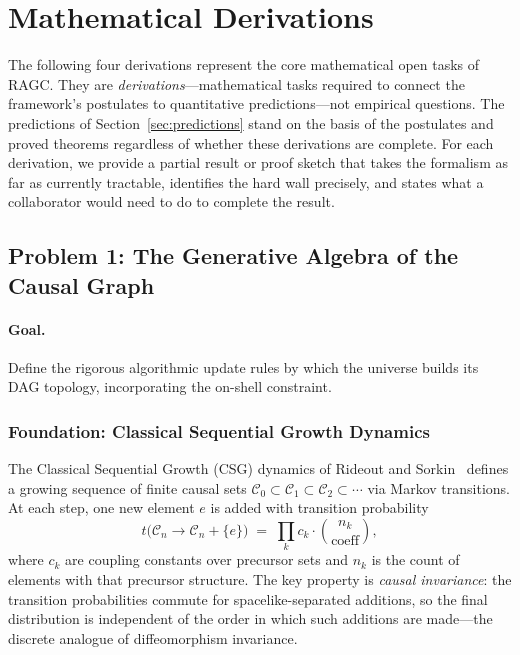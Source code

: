 \documentclass[11pt,a4paper]{article}
\theoremstyle{plain}
\theoremstyle{definition}
\theoremstyle{remark}
\begin{document}
\section{Mathematical Derivations}
\label{sec:math}

The following four derivations represent the core mathematical open tasks of
RAGC. They are \emph{derivations}---mathematical tasks required to connect the
framework's postulates to quantitative predictions---not empirical questions.
The predictions of Section~\ref{sec:predictions} stand on the basis of the
postulates and proved theorems regardless of whether these derivations are complete.
For each derivation, we provide a partial result or proof sketch that takes the
formalism as far as currently tractable, identifies the hard wall precisely, and
states what a collaborator would need to do to complete the result.

\subsection{Problem 1: The Generative Algebra of the Causal Graph}
\label{sec:algebra}

\paragraph{Goal.} Define the rigorous algorithmic update rules by which the
universe builds its DAG topology, incorporating the on-shell constraint.

\subsubsection{Foundation: Classical Sequential Growth Dynamics}

The Classical Sequential Growth (CSG) dynamics of Rideout and
Sorkin~\citep{RideoutSorkin2000} defines a growing sequence of finite causal sets
$\mathcal{C}_{0} \subset \mathcal{C}_{1} \subset \mathcal{C}_{2} \subset \cdots$
via Markov transitions. At each step, one new element $e$ is added with transition
probability
\begin{equation}
  t\bigl(\mathcal{C}_{n} \to \mathcal{C}_{n} + \{e\}\bigr)
  \;=\;
  \prod_{k} c_{k} \cdot \binom{n_{k}}{\text{coeff}},
  \label{eq:amplitude}
\end{equation}
where $c_{k}$ are coupling constants over precursor sets and $n_{k}$ is the count
of elements with that precursor structure. The key property is \emph{causal
invariance}: the transition probabilities commute for spacelike-separated
additions, so the final distribution is independent of the order in which such
additions are made---the discrete analogue of diffeomorphism invariance.
\end{document}
